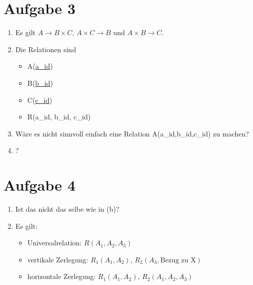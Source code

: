 \documentclass{article}
\begin{document}
	\section*{Aufgabe 3}
	\begin{enumerate}[label=(\alph*)]
		\item Es gilt $A\to B\times C$, $A\times C\to B$ und $A\times B\to C$.
		\item Die Relationen sind
		\begin{itemize}
			\item A(\underline{a\_id})
			\item B(\underline{b\_id})
			\item C(\underline{c\_id})
			\item R(a\_id, b\_id, c\_id)
		\end{itemize}
		\item Wäre es nicht sinnvoll einfach eine Relation A(a\_id,b\_id,c\_id) zu machen?
		\item ?
	\end{enumerate}
	
	\section*{Aufgabe 4}
	\begin{enumerate}[label=(\alph*)]
		\item Ist das nicht das selbe wie in (b)?
		\item Es gilt:
		\begin{itemize}
			\item Universalrelation: $R(A_1,A_2,A_3)$
			\item vertikale Zerlegung: $R_1(A_1,A_2)$, $R_2(A_3, \text{Bezug zu X})$
			\item horizontale Zerlegung: $R_1(A_1,A_2)$, $R_2(A_1,A_2,A_3)$
		\end{itemize}
	\end{enumerate}
	
\end{document}
